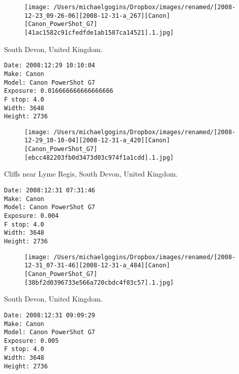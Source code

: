 \documentclass[11pt,letter,DIV=14,paper=landscape]{scrbook}
\begin{document}
\begin{figure}
\texttt{[image: /Users/michaelgogins/Dropbox/images/renamed/[2008-12-23\_09-26-06][2008-12-31-a\_267][Canon][Canon\_PowerShot\_G7][41ac1582c91cfedfde1ab1587ca14521].1.jpg]}
\end{figure}
    
\clearpage
\noindent South Devon, United Kingdom.
\noindent
\begin{lstlisting}
Date: 2008:12:29 10:10:04
Make: Canon
Model: Canon PowerShot G7
Exposure: 0.016666666666666666
F stop: 4.0
Width: 3648
Height: 2736
\end{lstlisting}
\clearpage

\begin{figure}
\texttt{[image: /Users/michaelgogins/Dropbox/images/renamed/[2008-12-29\_10-10-04][2008-12-31-a\_420][Canon][Canon\_PowerShot\_G7][ebcc482203fb0d3473d03c974f1a1cdd].1.jpg]}
\end{figure}
    
\clearpage
\noindent Cliffs near Lyme Regis, South Devon, United Kingdom.
\noindent
\begin{lstlisting}
Date: 2008:12:31 07:31:46
Make: Canon
Model: Canon PowerShot G7
Exposure: 0.004
F stop: 4.0
Width: 3648
Height: 2736
\end{lstlisting}
\clearpage

\begin{figure}
\texttt{[image: /Users/michaelgogins/Dropbox/images/renamed/[2008-12-31\_07-31-46][2008-12-31-a\_484][Canon][Canon\_PowerShot\_G7][38bf2d0396733e566a720cbdc4f03c57].1.jpg]}
\end{figure}
    
\clearpage
\noindent South Devon, United Kingdom.
\noindent
\begin{lstlisting}
Date: 2008:12:31 09:09:29
Make: Canon
Model: Canon PowerShot G7
Exposure: 0.005
F stop: 4.0
Width: 3648
Height: 2736
\end{lstlisting}
\clearpage
\end{document}
